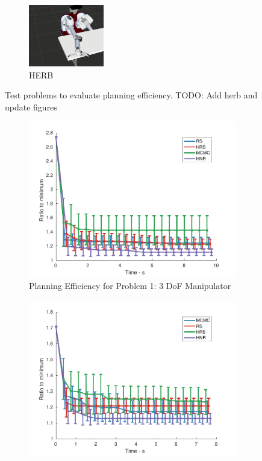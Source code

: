 \documentclass[letterpaper, 10 pt, conference]{ieeeconf}  %
\begin{document}
\begin{figure}[t!]
\begin{subfigure}[b]{\textwidth}
    \includegraphics[height=2.7cm]{fig/planning_efficiency/herb_batting_5}
	\caption{HERB}
	\label{fig:planning_efficiency:herb:example}
	\end{subfigure}
	\caption{Test problems to evaluate planning efficiency. TODO: Add herb and update figures}
	\label{fig:problems}
\end{figure} 


\begin{figure}[t!]
	\centering
	\begin{subfigure}[b]{0.32\textwidth}
		\includegraphics[width=\linewidth]{fig/planning_efficiency/3dof_general}
		\caption{\captionstyle Planning Efficiency for Problem 1: 3 DoF Manipulator}
		\label{fig:planning_efficiency:3dof:general}
	\end{subfigure}	
	\begin{subfigure}[b]{0.32\textwidth}
		\includegraphics[width=\linewidth]{fig/planning_efficiency/6dof_hammering}

\end{subfigure}
\end{figure}
\end{document}

